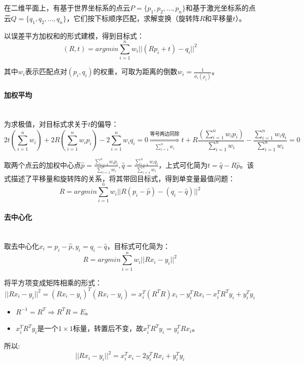 \documentclass[
12pt, %
a4paper, 
oneside, %
headinclude,footinclude, %
]{scrartcl}
\begin{document}
在二维平面上，有基于世界坐标系的点云$ P = \{p_1, p_2, \dots, p_n\} $和基于激光坐标系的点云$ Q = \{q_1, q_2, \dots, q_n\} $，它们按下标顺序匹配，求解变换（旋转阵$ R $和平移量$ t $）。

以误差平方加权和的形式建模，得到目标式：
$$ (R, t) = argmin \sum_{i = 1}^{n}w_i ||(R p_i + t) - q_i||^2 $$

其中$ w_i $表示匹配点对$ (p_i, q_i) $的权重，可取为距离的倒数$ w_i = \frac{1}{\sigma_i(\rho_i)} $。
\paragraph{加权平均}~\\

为求极值，对目标式求关于$ t $的偏导：
$$ 
2t(\sum_{i = 1}^{n} w_i) + 2R(\sum_{i = 1}^{n} w_i p_i) - 2\sum_{i = 1}^{n} w_i q_i = 0 
\overset{\text{等号两边同除}}{\underset{\sum_{i = 1}^{n} w_i}{\Longrightarrow}}
t + R\frac{(\sum_{i = 1}^{n} w_i p_i)}{\sum_{i = 1}^{n} w_i} - \frac{\sum_{i = 1}^{n} w_i q_i}{\sum_{i = 1}^{n} w_i} = 0
$$

取两个点云的加权中心点$ \hat{p} = \frac{\sum_{i = 1}^{n} w_i p_i}{\sum_{i = 1}^{n} w_i}, \hat{q} = \frac{\sum_{i = 1}^{n} w_i q_i}{\sum_{i = 1}^{n} w_i} $，上式可化简为$ t = \hat{q} - R \hat{p} $。该式描述了平移量和旋转阵的关系，将其带回目标式，得到单变量最值问题：
$$ R = argmin \sum_{i = 1}^{n}w_i ||R(p_i - \hat{p}) - (q_i - \hat{q})||^2 $$
\paragraph{去中心化}~\\

取去中心化$ x_i = p_i - \hat{p}, y_i = q_i - \hat{q} $，目标式可化简为：
$$ R = argmin \sum_{i = 1}^{n}w_i ||R x_i - y_i||^2 $$

将平方项变成矩阵相乘的形式：
$$ ||R x_i - y_i||^2 = (R x_i - y_i)^T(R x_i - y_i) = x_i^T (R^T R) x_i - y_i^T R x_i - x_i^T R^T y_i + y_i^T y_i $$
\begin{itemize}
\item $ R^{-1} = R^T \Rightarrow R^T R = E $。
\item $ x_i^T R^T y_i $是一个$ 1 \times 1 $标量，转置后不变，故$ x_i^T R^T y_i = y_i^T R x_i $。
\end{itemize}

所以:
$$ ||R x_i - y_i||^2 = x_i^T x_i - 2 y_i^T R x_i + y_i^T y_i $$
\end{document}
